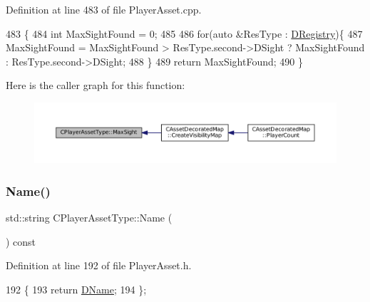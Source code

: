 Definition at line 483 of file Player\+Asset.\+cpp.


\begin{DoxyCode}
483                               \{
484     \textcolor{keywordtype}{int} MaxSightFound = 0;
485     
486     \textcolor{keywordflow}{for}(\textcolor{keyword}{auto} &ResType : \hyperlink{classCPlayerAssetType_a24f4ccd06fbddacc936e31a2f1f12ed5}{DRegistry})\{
487         MaxSightFound = MaxSightFound > ResType.second->DSight ? MaxSightFound : ResType.second->DSight;
488     \}
489     \textcolor{keywordflow}{return} MaxSightFound;
490 \}
\end{DoxyCode}
Here is the caller graph for this function\+:\nopagebreak
\begin{figure}[H]
\begin{center}
\leavevmode
\includegraphics[width=350pt]{classCPlayerAssetType_a1c1648ef0fdd2d112508c2ef9b7b70d1_icgraph}
\end{center}
\end{figure}
\hypertarget{classCPlayerAssetType_afd1b77119e34b459918551a08012ed35}{}\label{classCPlayerAssetType_afd1b77119e34b459918551a08012ed35} 
\subsubsection{\texorpdfstring{Name()}{Name()}}
{\footnotesize\ttfamily std\+::string C\+Player\+Asset\+Type\+::\+Name (\begin{DoxyParamCaption}{ }\end{DoxyParamCaption}) const\hspace{0.3cm}{\ttfamily [inline]}}



Definition at line 192 of file Player\+Asset.\+h.


\begin{DoxyCode}
192                               \{
193             \textcolor{keywordflow}{return} \hyperlink{classCPlayerAssetType_a95b557ce33af1aaecb26e8d78b0e2706}{DName};  
194         \};
\end{DoxyCode}
\hypertarget{classCPlayerAssetType_a42d55b6d7606e021c063fce3a14c56de}{}\label{classCPlayerAssetType_a42d55b6d7606e021c063fce3a14c56de} 
